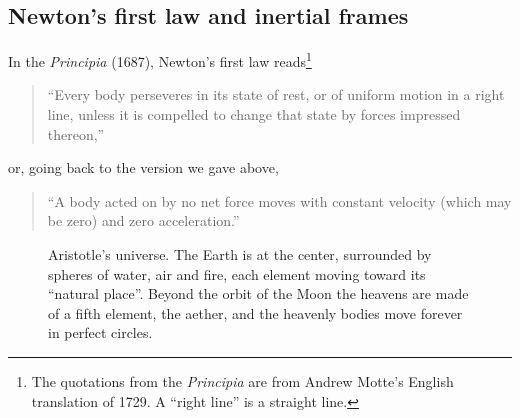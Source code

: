 \documentclass[11pt,a4paper]{article}
\begin{document}
\subsection{Newton's first law and inertial frames}\label{sec:first}

In the \emph{Principia} (1687), Newton's first law reads\footnote{The quotations from the
\emph{Principia} are from Andrew Motte's English translation of 1729. A ``right line'' is a
straight line.}
\begin{quote}
``Every body perseveres in its state of rest, or of uniform motion in a right line, unless it is
compelled to change that state by forces impressed thereon,''
\end{quote}
or, going back to the version we gave above,
\begin{quote}
``A body acted on by no net force moves with constant velocity (which may be zero) and zero
acceleration.''
\end{quote}

\begin{figure}[ht]
\centering
{}
\caption{Aristotle's universe. The Earth is at the center, surrounded by spheres of water, air and
fire, each element moving toward its ``natural place''. Beyond the orbit of the Moon the heavens
are made of a fifth element, the aether, and the heavenly bodies move forever in perfect
circles.}\label{fig:aristotle}
\end{figure}
\end{document}
